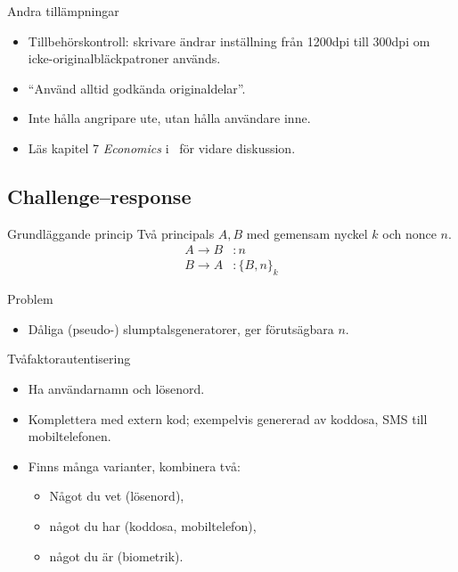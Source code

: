 \documentclass{beamer}
\theoremstyle{definition}
\theoremstyle{remark}
\newcommand{\encrypt}[2]{\{#1\}_{#2}}
\begin{document}
\begin{frame}{Andra tillämpningar}
  \begin{itemize}
    \item Tillbehörskontroll: skrivare ändrar inställning från \unit{1200}{dpi} 
      till \unit{300}{dpi} om icke-originalbläckpatroner används.
    \item \enquote{Använd alltid godkända originaldelar}.
    \item Inte hålla angripare ute, utan hålla användare inne.
    \item Läs kapitel 7 \emph{Economics} i~\cite{Anderson2008sea} för vidare 
      diskussion.
  \end{itemize}
\end{frame}

\subsection{Challenge--response}

\begin{frame}
  \begin{block}{Grundläggande princip}
    Två principals \(A, B\) med gemensam nyckel \(k\) och nonce \(n\).
    \begin{align*}
      A\to B &\colon n \\
      B\to A &\colon \encrypt{B, n}{k}
    \end{align*}
  \end{block}
  \begin{block}{Problem}
    \begin{itemize}
      \item Dåliga (pseudo-) slumptalsgeneratorer, ger förutsägbara \(n\).
    \end{itemize}
  \end{block}
\end{frame}

\begin{frame}{Tvåfaktorautentisering}
  \begin{itemize}
    \item Ha användarnamn och lösenord.
    \item Komplettera med extern kod; exempelvis genererad av koddosa, SMS till 
      mobiltelefonen.
    \item Finns många varianter, kombinera två:
      \begin{itemize}
        \item Något du vet (lösenord),
        \item något du har (koddosa, mobiltelefon),
        \item något du är (biometrik).
      \end{itemize}
  \end{itemize}
\end{frame}
\end{document}
